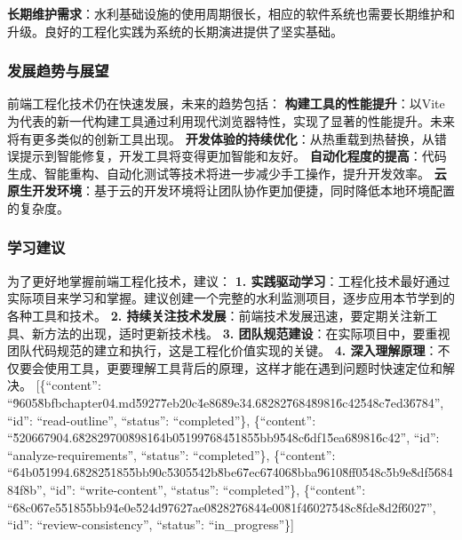 \textbf{长期维护需求}：水利基础设施的使用周期很长，相应的软件系统也需要长期维护和升级。良好的工程化实践为系统的长期演进提供了坚实基础。 \subsubsection{发展趋势与展望}\label{ux53d1ux5c55ux8d8bux52bfux4e0eux5c55ux671b} 前端工程化技术仍在快速发展，未来的趋势包括： \textbf{构建工具的性能提升}：以Vite为代表的新一代构建工具通过利用现代浏览器特性，实现了显著的性能提升。未来将有更多类似的创新工具出现。 \textbf{开发体验的持续优化}：从热重载到热替换，从错误提示到智能修复，开发工具将变得更加智能和友好。 \textbf{自动化程度的提高}：代码生成、智能重构、自动化测试等技术将进一步减少手工操作，提升开发效率。 \textbf{云原生开发环境}：基于云的开发环境将让团队协作更加便捷，同时降低本地环境配置的复杂度。 \subsubsection{学习建议}\label{ux5b66ux4e60ux5efaux8bae} 为了更好地掌握前端工程化技术，建议： \textbf{1. 实践驱动学习}：工程化技术最好通过实际项目来学习和掌握。建议创建一个完整的水利监测项目，逐步应用本节学到的各种工具和技术。 \textbf{2. 持续关注技术发展}：前端技术发展迅速，要定期关注新工具、新方法的出现，适时更新技术栈。 \textbf{3. 团队规范建设}：在实际项目中，要重视团队代码规范的建立和执行，这是工程化价值实现的关键。 \textbf{4. 深入理解原理}：不仅要会使用工具，更要理解工具背后的原理，这样才能在遇到问题时快速定位和解决。 {[}\{``content'': ``\u9605\u8bfbchapter04.md\u5927\u7eb2\uff0c\u4e86\u89e34.6\u8282\u7684\u8981\u6c42\u548c\u7ed3\u6784'', ``id'': ``read-outline'', ``status'': ``completed''\}, \{``content'': ``\u5206\u67904.6\u8282\u9700\u8981\u64b0\u5199\u7684\u5185\u5bb9\u548c\u6df1\u5ea6\u8981\u6c42'', ``id'': ``analyze-requirements'', ``status'': ``completed''\}, \{``content'': ``\u64b0\u51994.6\u8282\u5185\u5bb9\uff0c\u5305\u542b\u8be6\u7ec6\u7406\u8bba\u9610\u8ff0\u548c\u5b9e\u8df5\u6848\u4f8b'', ``id'': ``write-content'', ``status'': ``completed''\}, \{``content'': ``\u68c0\u67e5\u5185\u5bb9\u4e0e\u524d\u9762\u7ae0\u8282\u7684\u4e00\u81f4\u6027\u548c\u8fde\u8d2f\u6027'', ``id'': ``review-consistency'', ``status'': ``in\_progress''\}{]}

